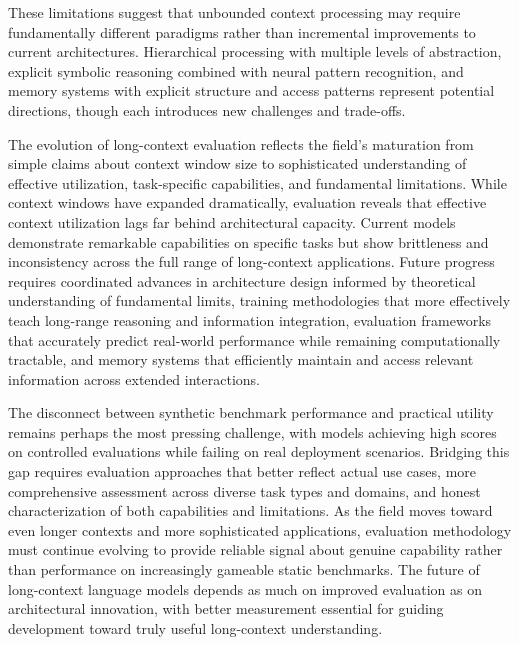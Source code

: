 These limitations suggest that unbounded context processing may require fundamentally different paradigms rather than incremental improvements to current architectures. Hierarchical processing with multiple levels of abstraction, explicit symbolic reasoning combined with neural pattern recognition, and memory systems with explicit structure and access patterns represent potential directions, though each introduces new challenges and trade-offs.

The evolution of long-context evaluation reflects the field's maturation from simple claims about context window size to sophisticated understanding of effective utilization, task-specific capabilities, and fundamental limitations. While context windows have expanded dramatically, evaluation reveals that effective context utilization lags far behind architectural capacity. Current models demonstrate remarkable capabilities on specific tasks but show brittleness and inconsistency across the full range of long-context applications. Future progress requires coordinated advances in architecture design informed by theoretical understanding of fundamental limits, training methodologies that more effectively teach long-range reasoning and information integration, evaluation frameworks that accurately predict real-world performance while remaining computationally tractable, and memory systems that efficiently maintain and access relevant information across extended interactions.

The disconnect between synthetic benchmark performance and practical utility remains perhaps the most pressing challenge, with models achieving high scores on controlled evaluations while failing on real deployment scenarios. Bridging this gap requires evaluation approaches that better reflect actual use cases, more comprehensive assessment across diverse task types and domains, and honest characterization of both capabilities and limitations. As the field moves toward even longer contexts and more sophisticated applications, evaluation methodology must continue evolving to provide reliable signal about genuine capability rather than performance on increasingly gameable static benchmarks. The future of long-context language models depends as much on improved evaluation as on architectural innovation, with better measurement essential for guiding development toward truly useful long-context understanding.
